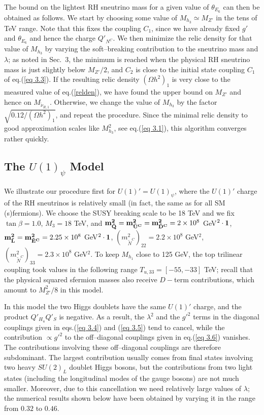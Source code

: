 \documentclass[a4paper,11pt]{article}
\begin{document}
The bound on the lightest RH sneutrino mass for a given value of
$\theta_{E_6}$ can then be obtained as follows. We start by choosing
some value of $M_{h_3} \simeq M_{Z'}$ in the tens of TeV range. Note
that this fixes the coupling $C_1$, since we have already fixed $g'$
and $\theta_{E_6}$ and hence the charge $Q'_{N^C}$. We then minimize
the relic density for that value of $M_{h_3}$ by varying the
soft--breaking contribution to the sneutrino mass and $\lambda$; as
noted in Sec.~3, the minimum is reached when the physical RH sneutrino
mass is just slightly below $M_{Z'}/2$, and $C_2$ is close to the initial state
coupling $C_1$ of eq.(\ref{eq 3.3}). If the resulting relic density
$(\Omega h^2)_1$ is very close to the measured value of
eq.(\ref{relden}), we have found the upper bound on $M_{Z'}$ and hence
on $M_{\tilde \nu_{R,1}}$. Otherwise, we change the value of
$M_{h_3}$ by the factor $\sqrt{0.12 / (\Omega h^2)_1}$, and repeat the
procedure. Since the minimal relic density to good approximation
scales like $M_{h_3}^2$, see eq.(\ref{eq 3.1}), this algorithm
converges rather quickly.


\subsection{The $U(1)_{\psi}$ Model}  
\label{subsection4.2}

We illustrate our procedure first for $U(1)' = U(1)_\psi$, where the
$U(1)'$ charge of the RH sneutrinos is relatively small (in fact, the
same as for all SM (s)fermions). We choose the SUSY breaking scale to
be 18 TeV and we fix $\tan{\beta}=1.0$, $M_3=18$ TeV, and
${\bf m^2_{\tilde Q}} = {\bf m^2_{\tilde U^C}} = {\bf m^2_{\tilde
    D^C}} = 2 \times 10^8$ GeV$^2\cdot {\bf 1}$,
${\bf m^2_{\tilde L}}={\bf m^2_{\tilde E^C}} = 2.25 \times 10^{8}$
GeV$^2 \cdot {\bf 1}$,
$\left(m^2_{\tilde N^C}\right)_{22} = 2.2 \times 10^8$ GeV$^2$,
$\left(m^2_{\tilde N^C}\right)_{33} = 2.3 \times 10^{8}$ GeV$^2$. To
keep $M_{h_{1}}$ close to 125 GeV, the top trilinear coupling took
values in the following range ${T_{u,33}}= [-55, -33]$ TeV; recall
that the physical squared sfermion masses also receive $D-$term
contributions, which amount to $M^2_{Z'}/8$ in this model.

In this model the two Higgs doublets have the same $U(1)'$ charge, and
the product $Q'_{H_u} Q'_S$ is negative. As a result, the $\lambda^2$
and the $g'^2$ terms in the diagonal couplings given in eqs.(\ref{eq
  3.4}) and (\ref{eq 3.5}) tend to cancel, while the contribution
$\propto g'^2$ to the off--diagonal couplings given in eq.(\ref{eq
  3.6}) vanishes.  The contributions involving these off--diagonal
couplings are therefore subdominant. The largest contribution usually
comes from final states involving two heavy $SU(2)_{L}$ doublet Higgs
bosons, but the contributions from two light states (including the
longitudinal modes of the gauge bosons) are not much
smaller. Moreover, due to this cancellation we need relatively large
values of $\lambda$; the numerical results shown below have been
obtained by varying it in the range from $0.32$ to $0.46$.
\end{document}
